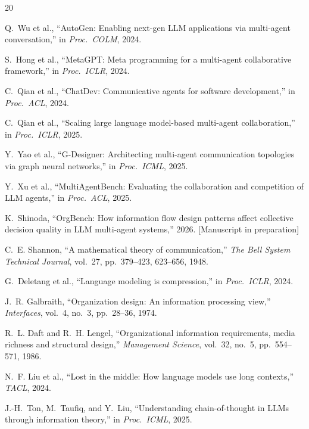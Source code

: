 \documentclass[conference]{IEEEtran}
\begin{document}
\begin{thebibliography}{20}

Q.~Wu et al.,
``AutoGen: Enabling next-gen LLM applications via multi-agent conversation,''
in \emph{Proc.\ COLM}, 2024.

S.~Hong et al.,
``MetaGPT: Meta programming for a multi-agent collaborative framework,''
in \emph{Proc.\ ICLR}, 2024.

C.~Qian et al.,
``ChatDev: Communicative agents for software development,''
in \emph{Proc.\ ACL}, 2024.

C.~Qian et al.,
``Scaling large language model-based multi-agent collaboration,''
in \emph{Proc.\ ICLR}, 2025.

Y.~Yao et al.,
``G-Designer: Architecting multi-agent communication topologies via graph neural networks,''
in \emph{Proc.\ ICML}, 2025.

Y.~Xu et al.,
``MultiAgentBench: Evaluating the collaboration and competition of LLM agents,''
in \emph{Proc.\ ACL}, 2025.

K.~Shinoda,
``OrgBench: How information flow design patterns affect collective decision quality in LLM multi-agent systems,''
2026. [Manuscript in preparation]

C.~E. Shannon,
``A mathematical theory of communication,''
\emph{The Bell System Technical Journal}, vol.~27, pp.~379--423, 623--656, 1948.

G.~Deletang et al.,
``Language modeling is compression,''
in \emph{Proc.\ ICLR}, 2024.

J.~R. Galbraith,
``Organization design: An information processing view,''
\emph{Interfaces}, vol.~4, no.~3, pp.~28--36, 1974.

R.~L. Daft and R.~H. Lengel,
``Organizational information requirements, media richness and structural design,''
\emph{Management Science}, vol.~32, no.~5, pp.~554--571, 1986.

N.~F. Liu et al.,
``Lost in the middle: How language models use long contexts,''
\emph{TACL}, 2024.

J.-H.~Ton, M.~Taufiq, and Y.~Liu,
``Understanding chain-of-thought in LLMs through information theory,''
in \emph{Proc.\ ICML}, 2025.


\end{thebibliography}
\end{document}
